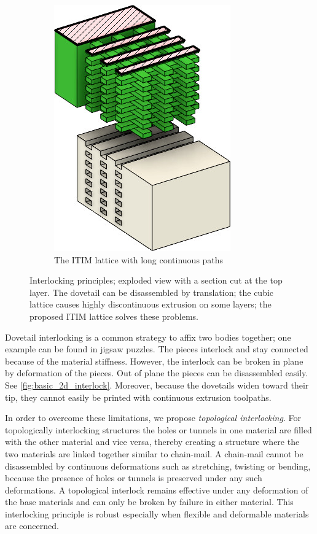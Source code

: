 \begin{figure}
\begin{subfigure}[B]{.36\columnwidth}
		\includegraphics[height=\figheight]{sources-method-basic_lattice.jpg}
		\caption{The ITIM lattice with long continuous paths}
		\label{fig:basic_structure_single_mat}
	\end{subfigure}
	\caption{Interlocking principles; exploded view with a section cut at the top layer. The dovetail can be disassembled by translation; the cubic lattice causes highly discontinuous extrusion on some layers; the proposed ITIM lattice solves these problems.}
	\label{fig:basic_structure}
\end{figure}





Dovetail interlocking is a common strategy to affix two bodies together;
one example can be found in jigsaw puzzles.
The pieces interlock and stay connected because of the material stiffness.
However, the interlock can be broken in plane by deformation of the pieces.
Out of plane the pieces can be disassembled easily.
See \cref{fig:basic_2d_interlock}.
Moreover, because the dovetails widen toward their tip, they cannot easily be printed with continuous extrusion toolpaths.

In order to overcome these limitations, we propose \emph{topological interlocking}.
For topologically interlocking structures the holes or tunnels in one material are filled with the other material and vice versa,
thereby creating a structure where the two materials are linked together similar to chain-mail.
A chain-mail cannot be disassembled by continuous deformations such as stretching, twisting or bending,
because the presence of holes or tunnels is preserved under any such deformations.
A topological interlock remains effective under any deformation of the base materials and can only be broken by failure in either material.
This interlocking principle is robust especially when flexible and deformable materials are concerned.

